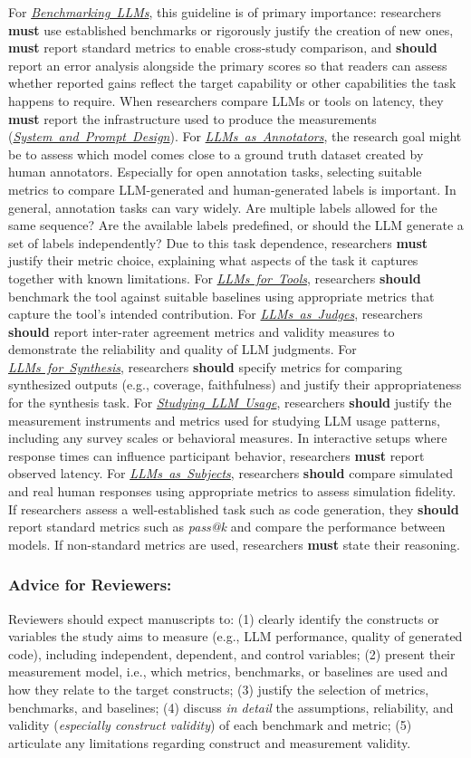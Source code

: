 \documentclass[smallextended]{svjour3}
\newcommand{\must}{\textbf{must}\xspace}
\newcommand{\should}{\textbf{should}\xspace}
\newcommand{\annotators}{\hyperref[sec:llms-as-annotators]{\mbox{\emph{LLMs as Annotators}}}\xspace}
\newcommand{\judges}{\hyperref[sec:llms-as-judges]{\mbox{\emph{LLMs as Judges}}}\xspace}
\newcommand{\synthesis}{\hyperref[sec:llms-for-synthesis]{\mbox{\emph{LLMs for Synthesis}}}\xspace}
\newcommand{\subjects}{\hyperref[sec:llms-as-subjects]{\mbox{\emph{LLMs as Subjects}}}\xspace}
\newcommand{\llmusage}{\hyperref[sec:studying-llm-usage-in-software-engineering]{\mbox{\emph{Studying LLM Usage}}}\xspace}
\newcommand{\newtools}{\hyperref[sec:llms-for-new-software-engineering-tools]{\mbox{\emph{LLMs for Tools}}}\xspace}
\newcommand{\benchmarkingtasks}{\hyperref[sec:benchmarking-llms-for-software-engineering-tasks]{\mbox{\emph{Benchmarking LLMs}}}\xspace}
\newcommand{\annotators}{\href{/study-types/annotators/}{\emph{LLMs as Annotators}}\xspace}
\newcommand{\judges}{\href{/study-types/judges/}{\emph{LLMs as Judges}}\xspace}
\newcommand{\synthesis}{\href{/study-types/synthesis/}{\emph{LLMs for Synthesis}}\xspace}
\newcommand{\subjects}{\href{/study-types/subjects/}{\emph{LLMs as Subjects}}\xspace}
\newcommand{\llmusage}{\href{/study-types/usage/}{\emph{Studying LLM Usage}}\xspace}
\newcommand{\newtools}{\href{/study-types/tools/}{\emph{LLMs for Tools}}\xspace}
\newcommand{\benchmarkingtasks}{\href{/study-types/benchmarking/}{\emph{Benchmarking LLMs}}\xspace}
\newcommand{\design}{\hyperref[sec:report-system-and-prompt-design]{\mbox{\emph{System and Prompt Design}}}\xspace}
\newcommand{\design}{\href{/guidelines/design/}{\emph{System and Prompt Design}}\xspace}
\newcommand{\guidelinesubsubsection}[1]{\subsubsection{\bfseries #1:}}
\newcommand{\guidelinesubsubsection}[1]{\subsubsection{#1}}
\begin{document}
For \benchmarkingtasks, this guideline is of primary importance: researchers \must use established benchmarks or rigorously justify the creation of new ones, \must report standard metrics to enable cross-study comparison, and \should report an error analysis alongside the primary scores so that readers can assess whether reported gains reflect the target capability or other capabilities the task happens to require. When researchers compare LLMs or tools on latency, they \must report the infrastructure used to produce the measurements (\design).
For \annotators, the research goal might be to assess which model comes close to a ground truth dataset created by human annotators.
Especially for open annotation tasks, selecting suitable metrics to compare LLM-generated and human-generated labels is important.
In general, annotation tasks can vary widely.
Are multiple labels allowed for the same sequence? Are the available labels predefined, or should the LLM generate a set of labels independently?
Due to this task dependence, researchers \must justify their metric choice, explaining what aspects of the task it captures together with known limitations.
For \newtools, researchers \should benchmark the tool against suitable baselines using appropriate metrics that capture the tool's intended contribution.
For \judges, researchers \should report inter-rater agreement metrics and validity measures to demonstrate the reliability and quality of LLM judgments.
For \synthesis, researchers \should specify metrics for comparing synthesized outputs (e.g., coverage, faithfulness) and justify their appropriateness for the synthesis task.
For \llmusage, researchers \should justify the measurement instruments and metrics used for studying LLM usage patterns, including any survey scales or behavioral measures. In interactive setups where response times can influence participant behavior, researchers \must report observed latency.
For \subjects, researchers \should compare simulated and real human responses using appropriate metrics to assess simulation fidelity.
If researchers assess a well-established task such as code generation, they \should report standard metrics such as \emph{pass@k} and compare the performance between models.
If non-standard metrics are used, researchers \must state their reasoning.

\guidelinesubsubsection{Advice for Reviewers}

Reviewers should expect manuscripts to:
(1) clearly identify the constructs or variables the study aims to measure (e.g., LLM performance, quality of generated code), including independent, dependent, and control variables;
(2) present their measurement model, i.e., which metrics, benchmarks, or baselines are used and how they relate to the target constructs;
(3) justify the selection of metrics, benchmarks, and baselines;
(4) discuss \textit{in detail} the assumptions, reliability, and validity (\textit{especially construct validity}) of each benchmark and metric;
(5) articulate any limitations regarding construct and measurement validity.
\end{document}
